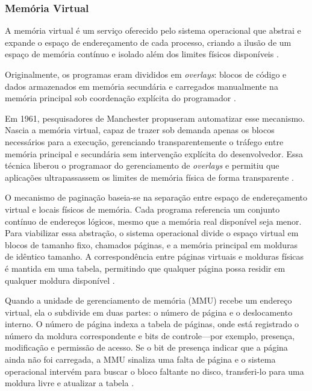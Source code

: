 \documentclass[
	12pt,				%
	openright,			%
	oneside,			%
	a4paper,			%
	english,			%
	french,				%
	spanish,			%
	brazil,				%
	]{abntex2}
\begin{document}
\subsubsection{Memória Virtual}

A memória virtual é um serviço oferecido pelo sistema operacional que abstrai e expande o espaço de endereçamento de cada processo, criando a ilusão de um espaço de memória contínuo e isolado além dos limites físicos disponíveis \cite[p.438]{tanenbaum_structured_2013}.

Originalmente, os programas eram divididos em \textit{overlays}: blocos de código e dados armazenados em memória secundária e carregados manualmente na memória principal sob coordenação explícita do programador \cite[p.439]{tanenbaum_structured_2013}.

Em 1961, pesquisadores de Manchester propuseram automatizar esse mecanismo. Nascia a memória virtual, capaz de trazer sob demanda apenas os blocos necessários para a execução, gerenciando transparentemente o tráfego entre memória principal e secundária sem intervenção explícita do desenvolvedor. Essa técnica liberou o programaor do gerenciamento de \textit{overlays} e permitiu que aplicações ultrapassassem os limites de memória física de forma transparente \cite[p.438–439]{tanenbaum_structured_2013}.


O mecanismo de paginação baseia-se na separação entre espaço de endereçamento virtual e locais físicos de memória. Cada programa referencia um conjunto contínuo de endereços lógicos, mesmo que a memória real disponível seja menor. Para viabilizar essa abstração, o sistema operacional divide o espaço virtual em blocos de tamanho fixo, chamados páginas, e a memória principal em molduras de idêntico tamanho. A correspondência entre páginas virtuais e molduras físicas é mantida em uma tabela, permitindo que qualquer página possa residir em qualquer moldura disponível \cite[p.439–441]{tanenbaum_structured_2013}.

Quando a unidade de gerenciamento de memória (MMU) recebe um endereço virtual, ela o subdivide em duas partes: o número de página e o deslocamento interno. O número de página indexa a tabela de páginas, onde está registrado o número da moldura correspondente e bits de controle—por exemplo, presença, modificação e permissão de acesso. Se o bit de presença indicar que a página ainda não foi carregada, a MMU sinaliza uma falta de página e o sistema operacional intervém para buscar o bloco faltante no disco, transferi-lo para uma moldura livre e atualizar a tabela \cite[p.442]{tanenbaum_structured_2013}.
\end{document}
